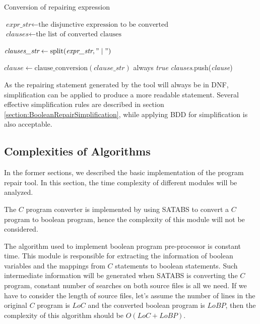 \begin{algorithm}
\caption{Conversion of repairing expression}
\begin{algorithmic}[1]

\STATE $\textit{expr\_str} \gets \text{the disjunctive expression to be converted}$
\STATE $\textit{clauses} \gets \text{the list of converted clauses}$
\STATE

\STATE $\textit{clauses\_str} \gets \text{split}(\textit{expr\_str}, "\mid")$

  \STATE $\textit{clause} \gets \text{clause\_conversion}(\textit{clause\_str})$
    \RETURN always \textit{true}
  \ENDIF
  \STATE \textit{clauses}.push(\textit{clause})
\ENDFOR

\end{algorithmic}
\end{algorithm}

As the repairing statement generated by the tool will always be in DNF, simplification can be applied to produce a more readable statement.
Several effective simplification rules are described in section \ref{section:BooleanRepairSimplification}, while applying BDD for simplification is also acceptable.

\subsection{Complexities of Algorithms}
In the former sections, we described the basic implementation of the program repair tool. In this section, the time complexity of different modules will be analyzed.

The $C$ program converter is implemented by using SATABS to convert a $C$ program to boolean program, hence the complexity of this module will not be considered.

The algorithm used to implement boolean program pre-processor is constant time.
This module is responsible for extracting the information of boolean variables and the mappings from $C$ statements to boolean statements.
Such intermediate information will be generated when SATABS is converting the $C$ program, constant number of searches on both source files is all we need.
If we have to consider the length of source files, let's assume the number of lines in the original $C$ program is $LoC$ and the converted boolean program is $LoBP$,
then the complexity of this algorithm should be $O(LoC + LoBP)$.

